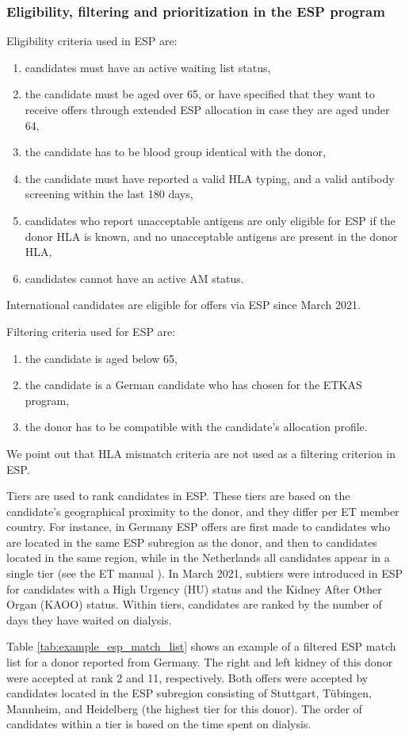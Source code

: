 \subsubsection{Eligibility, filtering and prioritization in the ESP program}
\label{subsection:esp_program}
Eligibility criteria used in ESP are:
\begin{enumerate}[noitemsep]
	\item candidates must have an active waiting list status,
	\item the candidate must be aged over 65, or have specified that they want to receive offers through extended ESP allocation in case they are aged under 64,
	\item the candidate has to be blood group identical with the donor,
	\item the candidate must have reported a valid HLA typing, and a valid antibody screening within the last 180 days,
	\item candidates who report unacceptable antigens are only eligible for ESP if the donor HLA is known, and no unacceptable antigens are present in the donor HLA,
	\item candidates cannot have an active AM status.
\end{enumerate}
International candidates are eligible for offers via ESP since March 2021. 
\par
Filtering criteria used for ESP are:
\begin{enumerate}[noitemsep]
	\item the candidate is aged below 65,
	\item the candidate is a German candidate who has chosen for the ETKAS program,
	\item the donor has to be compatible with the candidate's allocation profile.
\end{enumerate}
We point out that HLA mismatch criteria are not used as a filtering criterion in ESP.
\par
Tiers are used to rank candidates in ESP. These tiers are based on the candidate's geographical proximity to the donor, and they differ per ET member country. For instance, in Germany ESP offers are first made to candidates who are located in the same ESP subregion as the donor, and then to candidates located in the same region, while in the Netherlands all candidates appear in a single tier (see the ET manual \cite{manualKidney}). In March 2021, subtiers were introduced in ESP for candidates with a High Urgency (HU) status and the Kidney After Other Organ (KAOO) status. Within tiers, candidates are ranked by the number of days they have waited on dialysis.%
\par 
Table \ref{tab:example_esp_match_list} shows an example of a filtered ESP match list for a donor reported from Germany. The right and left kidney of this donor were accepted at rank 2 and 11, respectively. Both offers were accepted by candidates located in the ESP subregion consisting of Stuttgart, Tübingen, Mannheim, and Heidelberg (the highest tier for this donor). The order of candidates within a tier is based on the time spent on dialysis.

